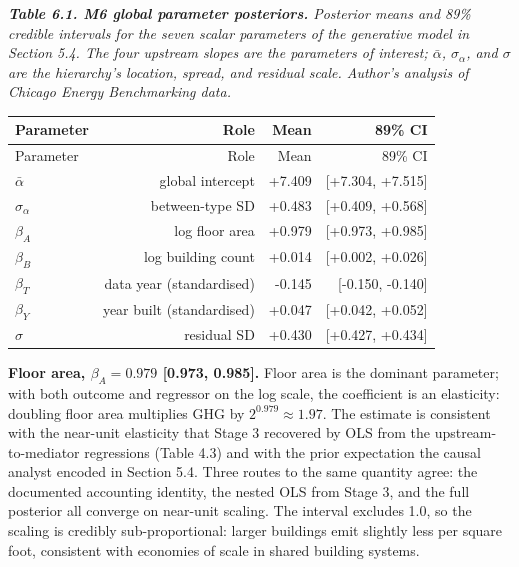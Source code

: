\par\medskip\noindent
{\small\itshape \textbf{Table 6.1. M6 global parameter posteriors.} Posterior means and 89\% credible intervals for the seven scalar parameters of the generative model in Section 5.4. The four upstream slopes are the parameters of interest; $\bar{\alpha}$, $\sigma_\alpha$, and $\sigma$ are the hierarchy's location, spread, and residual scale. Author's analysis of Chicago Energy Benchmarking data.\par}
\nopagebreak\medskip\nopagebreak
{
\setlength{\tabcolsep}{7pt}
\renewcommand{\arraystretch}{1.15}
\begin{longtable}{lrrr}
\toprule
Parameter & Role & Mean & 89\% CI \\
\midrule
\endfirsthead
\toprule
Parameter & Role & Mean & 89\% CI \\
\midrule
\endhead
\bottomrule
\endlastfoot
$\bar{\alpha}$ & global intercept & +7.409 & [+7.304, +7.515] \\
$\sigma_\alpha$ & between-type SD & +0.483 & [+0.409, +0.568] \\
$\beta_A$ & log floor area & +0.979 & [+0.973, +0.985] \\
$\beta_B$ & log building count & +0.014 & [+0.002, +0.026] \\
$\beta_T$ & data year (standardised) & -0.145 & [-0.150, -0.140] \\
$\beta_Y$ & year built (standardised) & +0.047 & [+0.042, +0.052] \\
$\sigma$ & residual SD & +0.430 & [+0.427, +0.434] \\
\end{longtable}
}
\par\medskip

\textbf{Floor area, $\beta_A = 0.979$ [0.973, 0.985].} Floor area is the dominant parameter; with both outcome and regressor on the log scale, the coefficient is an elasticity: doubling floor area multiplies GHG by $2^{0.979} \approx 1.97$. The estimate is consistent with the near-unit elasticity that Stage 3 recovered by OLS from the upstream-to-mediator regressions (Table 4.3) and with the prior expectation the causal analyst encoded in Section 5.4. Three routes to the same quantity agree: the documented accounting identity, the nested OLS from Stage 3, and the full posterior all converge on near-unit scaling. The interval excludes 1.0, so the scaling is credibly sub-proportional: larger buildings emit slightly less per square foot, consistent with economies of scale in shared building systems.

